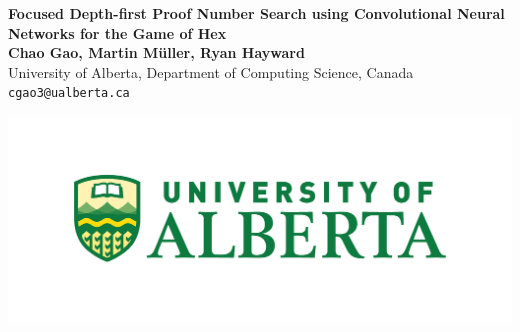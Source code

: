 \documentclass[a0,portrait]{a0poster}
\begin{document}


\begin{minipage}[b]{0.78\linewidth}
\Huge \color{NavyBlue} \textbf{Focused Depth-first Proof Number Search using
Convolutional Neural Networks for the Game of
Hex} \color{Black}\\ %
\huge \textbf{Chao Gao, Martin M\"{u}ller, Ryan Hayward}\\[0.5cm] %
\huge University of Alberta, Department of Computing Science, Canada\\[0.4cm] %
\Large \texttt{cgao3@ualberta.ca} \\
\end{minipage}
%
\begin{minipage}[b]{0.2\linewidth}
\includegraphics[width=14cm]{ua_logo.pdf}\\
\end{minipage}

\vspace{1cm} %

\end{document}
